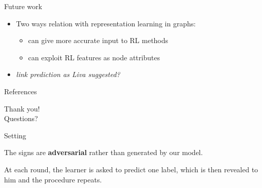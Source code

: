 \documentclass[10pt,svgnames,ignorenonframetext,final]{beamer}
\providecommand{\tightlist}{%
  \setlength{\itemsep}{0pt}\setlength{\parskip}{0pt}}
\begin{document}
\begin{frame}{Future work}
\protect\hypertarget{future-work}{}

\begin{itemize}
\tightlist
\item
  Two ways relation with representation learning in graphs:

  \begin{itemize}
  \tightlist
  \item
    can give more accurate input to RL methods
  \item
    can exploit RL features as node attributes
  \end{itemize}
\item
  \emph{link prediction as Liva suggested?}
\end{itemize}

\end{frame}

\begin{frame}{References}
  \printbibliography
\end{frame}

\begin{frame}[plain,c]

\begin{center}
\Huge Thank you! \\ Questions?
\end{center}

\end{frame}

\appendix


\begin{frame}{Setting}

The signs are \textbf{adversarial} rather than generated by our model.

At each round, the learner is asked to predict one label, which is then revealed to him and the
procedure repeats.

\end{frame}
\end{document}
